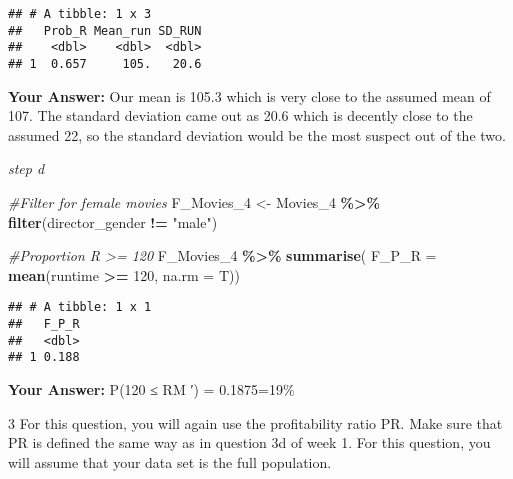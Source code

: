 \documentclass[
]{article}
\newenvironment{Shaded}{\begin{snugshade}}{\end{snugshade}}
\newcommand{\AttributeTok}[1]{\textcolor[rgb]{0.13,0.29,0.53}{#1}}
\newcommand{\CommentTok}[1]{\textcolor[rgb]{0.56,0.35,0.01}{\textit{#1}}}
\newcommand{\DecValTok}[1]{\textcolor[rgb]{0.00,0.00,0.81}{#1}}
\newcommand{\FunctionTok}[1]{\textcolor[rgb]{0.13,0.29,0.53}{\textbf{#1}}}
\newcommand{\NormalTok}[1]{#1}
\newcommand{\OtherTok}[1]{\textcolor[rgb]{0.56,0.35,0.01}{#1}}
\newcommand{\SpecialCharTok}[1]{\textcolor[rgb]{0.81,0.36,0.00}{\textbf{#1}}}
\newcommand{\StringTok}[1]{\textcolor[rgb]{0.31,0.60,0.02}{#1}}
\begin{document}
\begin{verbatim}
## # A tibble: 1 x 3
##   Prob_R Mean_run SD_RUN
##    <dbl>    <dbl>  <dbl>
## 1  0.657     105.   20.6
\end{verbatim}

\textbf{Your Answer:} Our mean is 105.3 which is very close to the
assumed mean of 107. The standard deviation came out as 20.6 which is
decently close to the assumed 22, so the standard deviation would be the
most suspect out of the two.

\emph{step d}

\begin{Shaded}
\begin{Highlighting}[]
\CommentTok{\#Filter for female movies}
\NormalTok{F\_Movies\_4 }\OtherTok{\textless{}{-}}\NormalTok{ Movies\_4 }\SpecialCharTok{\%\textgreater{}\%}
  \FunctionTok{filter}\NormalTok{(director\_gender }\SpecialCharTok{!=} \StringTok{"male"}\NormalTok{)}

\CommentTok{\#Proportion R \textgreater{}= 120}
\NormalTok{F\_Movies\_4 }\SpecialCharTok{\%\textgreater{}\%}
  \FunctionTok{summarise}\NormalTok{(}
    \AttributeTok{F\_P\_R =} \FunctionTok{mean}\NormalTok{(runtime }\SpecialCharTok{\textgreater{}=} \DecValTok{120}\NormalTok{, }\AttributeTok{na.rm =}\NormalTok{ T))}
\end{Highlighting}
\end{Shaded}

\begin{verbatim}
## # A tibble: 1 x 1
##   F_P_R
##   <dbl>
## 1 0.188
\end{verbatim}

\textbf{Your Answer:} P(120 ≤ R\textbar M ′) = 0.1875=19\%

3 For this question, you will again use the profitability ratio PR. Make
sure that PR is defined the same way as in question 3d of week 1. For
this question, you will assume that your data set is the full
population.
\end{document}

